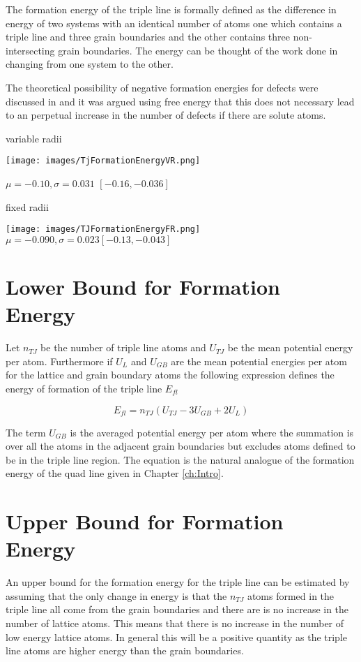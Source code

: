 \documentclass[12pt,a4paper]{book}
\begin{document}
The formation energy of the triple line is formally defined as the difference in energy of two systems with an identical number of atoms one which contains a triple line and three grain boundaries and the other contains three non-intersecting grain boundaries. The energy can be thought of the work done in changing from one system to the other.

The theoretical possibility of negative formation energies for defects were discussed in \cite{KIRCHHEIM20075129} and it was argued using free energy that this does not necessary lead to an perpetual increase in the number of defects if there are solute atoms.  

variable radii

\texttt{[image: images/TjFormationEnergyVR.png]} 

$\mu = -0.10, \sigma = 0.031$ $[-0.16,  -0.036]$


fixed radii

\texttt{[image: images/TJFormationEnergyFR.png]} 
$\mu = -0.090 , \sigma =  0.023 [-0.13, -0.043]$

\section{Lower Bound for Formation Energy}

Let $n_{TJ}$ be the number of triple line atoms and $U_{TJ}$ be the mean potential energy per atom. Furthermore if $U_{L}$ and $U_{GB}$ are the mean potential energies per atom for the lattice and grain boundary atoms the following expression defines the energy of formation of the triple line $E_{fl}$

\[ E_{fl} = n_{TJ}\left(U_{TJ} -3U_{GB} + 2U_{L} \right) \]

The term $U_{GB}$ is the averaged potential energy per atom where the summation is over all the atoms in the adjacent grain boundaries but excludes atoms defined to be in the triple line region. The equation is the natural analogue of the formation energy of the quad line given in Chapter \ref{ch:Intro}.



    

\section{Upper Bound for Formation Energy}

An upper bound for the formation energy for the triple line can be estimated by assuming that the only change in energy is that the  $n_{TJ}$ atoms formed in the triple line all come from the grain boundaries and there are is no increase in the number of lattice atoms. This means that there is no increase in the number of low energy lattice atoms. In general this will be a positive quantity as the triple line atoms are higher energy than the grain boundaries. 
\end{document}
